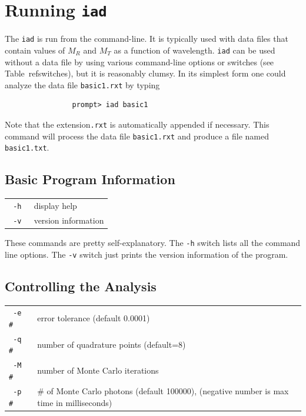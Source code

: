 \documentclass{article}
\newcommand\iadprog{\texttt{iad}}
\begin{document}
\clearpage
\section{Running \iadprog{}}

The \iadprog{} is run from the command-line.  It is typically used with
data files that contain values of $M_R$ and $M_T$ as a function of wavelength.
\iadprog{} can be used without a data file by using various command-line 
options or switches (see Table~ref{switches}), but it is reasonably clumsy.  In its simplest form 
one could analyze the data file \texttt{basic1.rxt} by typing
\begin{verbatim}
                prompt> iad basic1
\end{verbatim}
Note that the extension\texttt{.rxt} is automatically appended if necessary.
This command will process the data file \texttt{basic1.rxt} and produce a
file named \texttt{basic1.txt}.

\clearpage
\subsection{Basic Program Information}

\begin{center}
\begin{tabular}{lp{7cm}}
\texttt{ -h                  }& display help              \\
\texttt{ -v                  }& version information                        \\
\end{tabular}
\end{center}

These commands are pretty self-explanatory.  The \texttt{-h} switch lists all the
command line options.  The \texttt{-v} switch just prints the version information
of the program.

\subsection{Controlling the Analysis}

\begin{center}
\begin{tabular}{lp{7cm}}
\texttt{ -e \#               }& error tolerance (default 0.0001)           \\
\texttt{ -q \#               }& number of quadrature points (default=8)    \\
\texttt{ -M \#               }& number of Monte Carlo iterations           \\
\texttt{ -p \#               }& \# of Monte Carlo photons (default 100000),
                              (negative number is max time in milliseconds)\\[3mm]
\end{tabular}
\end{center}
\end{document}
